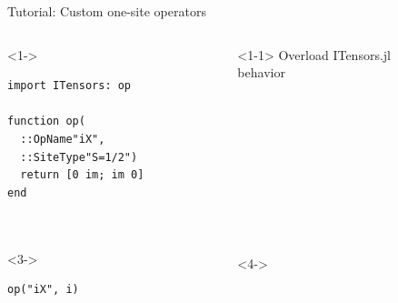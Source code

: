 \begin{frame}[fragile]{Tutorial: Custom one-site operators}

\begin{columns}

\begin{column}{4.5cm}

\begin{onlyenv}<1->

\begin{lstlisting}[language=JuliaLocal, style=julia, basicstyle=\scriptsize\ttfamily]
import ITensors: op

function op(
  ::OpName"iX",
  ::SiteType"S=1/2")
  return [0 im; im 0]
end



\end{lstlisting}

\end{onlyenv}

\begin{onlyenv}<3->

\begin{lstlisting}[language=JuliaLocal, style=julia, basicstyle=\scriptsize\ttfamily]
op("iX", i)
\end{lstlisting}

\end{onlyenv}

\end{column}

\begin{column}{4.5cm}

\begin{onlyenv}<1-1>
Overload ITensors.jl \\
behavior \\
~\\
~\\
~\\
~\\
~\\
~\\
~\\
~\\
~\\
\end{onlyenv}

\begin{onlyenv}<4->
~\\
~\\
~\\
~\\
\end{onlyenv}


\end{column}
\end{columns}
\end{frame}

